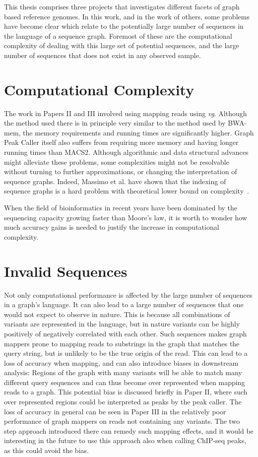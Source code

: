 This thesis comprises three projects that investigates different facets of graph based reference genomes.
In this work, and in the work of others, some problems have become clear which relate to the potentially large number of sequences in the language of a sequence graph. Foremost of these are the computational complexity of dealing with this large set of potential sequences, and the large number of sequences that does not exist in any observed sample.

\section{Computational Complexity}
The work in Papers II and III involved using mapping reads using \emph{vg}.
Although the method used there is in principle very similar to the method used by BWA-mem, the memory requirements and running times are significantly higher.
Graph Peak Caller itself also suffers from requiring more memory and having longer running times than MACS2. 
Although algorithmic and data structural advances might alleviate these problems, some complexities might not be resolvable without turning to further approximations, or changing the interpretation of sequence graphs.
Indeed, Massimo et al. have shown that the indexing of sequence graphs is a hard problem with theoretical lower bound on complexity~\cite{indexcomplexity}.

When the field of bioinformatics in recent years have been dominated by the sequencing capacity growing faster than Moore's law, it is worth to wonder how much accuracy gains is needed to justify the increase in computational complexity.

\section{Invalid Sequences}
Not only computational performance is affected by the large number of sequences in a graph's language.
It can also lead to a large number of sequences that one would not expect to observe in nature.
This is because all combinations of variants are represented in the language, but in nature variants can be highly positively of negatively correlated with each other.
Such sequences makes graph mappers prone to mapping reads to substrings in the graph that matches the query string, but is unlikely to be the true origin of the read.
This can lead to a loss of accuracy when mapping, and can also introduce biases in downstream analysis: Regions of the graph with many variants will be able to match many different query sequences and can thus become over represented when mapping reads to a graph.
This potential bias is discussed briefly in Paper II, where such over represented regions could be interpreted as peaks by the peak caller.
The loss of accuracy in general can be seen in Paper III in the relatively poor performance of graph mappers on reads not containing any variants.
The two step approach introduced there can remedy such mapping effects, and it would be interesting in the future to use this approach also when calling ChIP-seq peaks, as this could avoid the bias.

